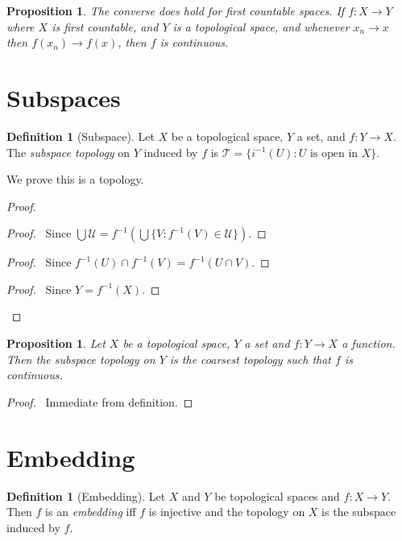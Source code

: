 \documentclass{book}
\let\qed\relax
\newtheorem{prop}[ax]{Proposition}
\theoremstyle{definition}
\newtheorem{df}[ax]{Definition}
\newcommand{\inv}[1]{\ensuremath{{#1}^{-1}}}
\begin{document}
\begin{prop}
The converse does hold for first countable spaces. If $f : X \rightarrow Y$ where $X$ is first countable, and $Y$ is a topological space, and whenever $x_n \rightarrow x$ then $f(x_n) \rightarrow f(x)$, then $f$ is continuous.
\end{prop}

\section{Subspaces}

\begin{df}[Subspace]
Let $X$ be a topological space, $Y$ a set, and $f : Y \rightarrow X$. The \emph{subspace topology} on $Y$ induced by $f$ is $\mathcal{T} = \{ \inv{i}(U) : U \text{ is open in } X \}$.

We prove this is a topology.
\end{df}

\begin{proof}
\pf
{}
\begin{proof}
	\pf\ Since $\bigcup \mathcal{U} = \inv{f}(\bigcup \{ V : \inv{f}(V) \in \mathcal{U}\})$.
\end{proof}
\begin{proof}
	\pf\ Since $\inv{f}(U) \cap \inv{f}(V) = \inv{f}(U 
\cap V)$.
\end{proof}
\begin{proof}
	\pf\ Since $Y = \inv{f}(X)$.
\end{proof}
\qed
\end{proof}

\begin{prop}
Let $X$ be a topological space, $Y$ a set and $f : Y \rightarrow X$ a function. Then the subspace topology on $Y$ is the coarsest topology such that $f$ is continuous.
\end{prop}

\begin{proof}
\pf\ Immediate from definition. \qed
\end{proof}

\section{Embedding}

\begin{df}[Embedding]
Let $X$ and $Y$ be topological spaces and $f : X \rightarrow Y$. Then $f$ is an \emph{embedding} iff $f$ is injective and the topology on $X$ is the subspace induced by $f$.
\end{df}
\end{document}
